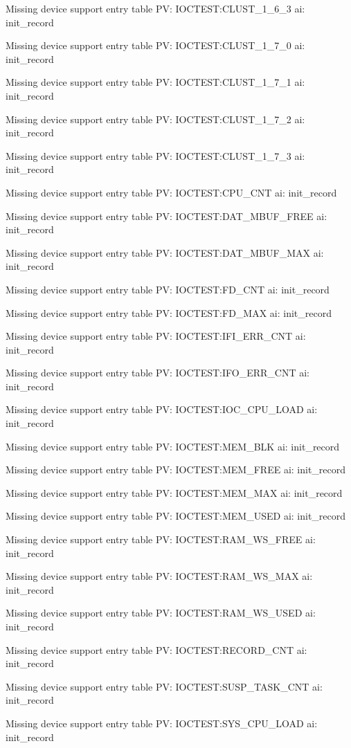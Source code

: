 Missing device support entry table PV: IOCTEST:CLUST_1_6_3 ai: init_record

Missing device support entry table PV: IOCTEST:CLUST_1_7_0 ai: init_record

Missing device support entry table PV: IOCTEST:CLUST_1_7_1 ai: init_record

Missing device support entry table PV: IOCTEST:CLUST_1_7_2 ai: init_record

Missing device support entry table PV: IOCTEST:CLUST_1_7_3 ai: init_record

Missing device support entry table PV: IOCTEST:CPU_CNT ai: init_record

Missing device support entry table PV: IOCTEST:DAT_MBUF_FREE ai: init_record

Missing device support entry table PV: IOCTEST:DAT_MBUF_MAX ai: init_record

Missing device support entry table PV: IOCTEST:FD_CNT ai: init_record

Missing device support entry table PV: IOCTEST:FD_MAX ai: init_record

Missing device support entry table PV: IOCTEST:IFI_ERR_CNT ai: init_record

Missing device support entry table PV: IOCTEST:IFO_ERR_CNT ai: init_record

Missing device support entry table PV: IOCTEST:IOC_CPU_LOAD ai: init_record

Missing device support entry table PV: IOCTEST:MEM_BLK ai: init_record

Missing device support entry table PV: IOCTEST:MEM_FREE ai: init_record

Missing device support entry table PV: IOCTEST:MEM_MAX ai: init_record

Missing device support entry table PV: IOCTEST:MEM_USED ai: init_record

Missing device support entry table PV: IOCTEST:RAM_WS_FREE ai: init_record

Missing device support entry table PV: IOCTEST:RAM_WS_MAX ai: init_record

Missing device support entry table PV: IOCTEST:RAM_WS_USED ai: init_record

Missing device support entry table PV: IOCTEST:RECORD_CNT ai: init_record

Missing device support entry table PV: IOCTEST:SUSP_TASK_CNT ai: init_record

Missing device support entry table PV: IOCTEST:SYS_CPU_LOAD ai: init_record

